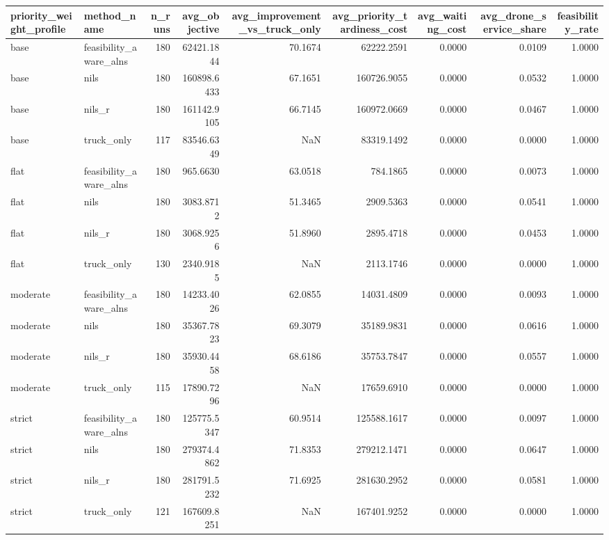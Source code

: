 \begin{tabular}{llrrrrrrr}
\toprule
priority_weight_profile & method_name & n_runs & avg_objective & avg_improvement_vs_truck_only & avg_priority_tardiness_cost & avg_waiting_cost & avg_drone_service_share & feasibility_rate \\
\midrule
base & feasibility_aware_alns & 180 & 62421.1844 & 70.1674 & 62222.2591 & 0.0000 & 0.0109 & 1.0000 \\
base & nils & 180 & 160898.6433 & 67.1651 & 160726.9055 & 0.0000 & 0.0532 & 1.0000 \\
base & nils_r & 180 & 161142.9105 & 66.7145 & 160972.0669 & 0.0000 & 0.0467 & 1.0000 \\
base & truck_only & 117 & 83546.6349 & NaN & 83319.1492 & 0.0000 & 0.0000 & 1.0000 \\
flat & feasibility_aware_alns & 180 & 965.6630 & 63.0518 & 784.1865 & 0.0000 & 0.0073 & 1.0000 \\
flat & nils & 180 & 3083.8712 & 51.3465 & 2909.5363 & 0.0000 & 0.0541 & 1.0000 \\
flat & nils_r & 180 & 3068.9256 & 51.8960 & 2895.4718 & 0.0000 & 0.0453 & 1.0000 \\
flat & truck_only & 130 & 2340.9185 & NaN & 2113.1746 & 0.0000 & 0.0000 & 1.0000 \\
moderate & feasibility_aware_alns & 180 & 14233.4026 & 62.0855 & 14031.4809 & 0.0000 & 0.0093 & 1.0000 \\
moderate & nils & 180 & 35367.7823 & 69.3079 & 35189.9831 & 0.0000 & 0.0616 & 1.0000 \\
moderate & nils_r & 180 & 35930.4458 & 68.6186 & 35753.7847 & 0.0000 & 0.0557 & 1.0000 \\
moderate & truck_only & 115 & 17890.7296 & NaN & 17659.6910 & 0.0000 & 0.0000 & 1.0000 \\
strict & feasibility_aware_alns & 180 & 125775.5347 & 60.9514 & 125588.1617 & 0.0000 & 0.0097 & 1.0000 \\
strict & nils & 180 & 279374.4862 & 71.8353 & 279212.1471 & 0.0000 & 0.0647 & 1.0000 \\
strict & nils_r & 180 & 281791.5232 & 71.6925 & 281630.2952 & 0.0000 & 0.0581 & 1.0000 \\
strict & truck_only & 121 & 167609.8251 & NaN & 167401.9252 & 0.0000 & 0.0000 & 1.0000 \\
\bottomrule
\end{tabular}
